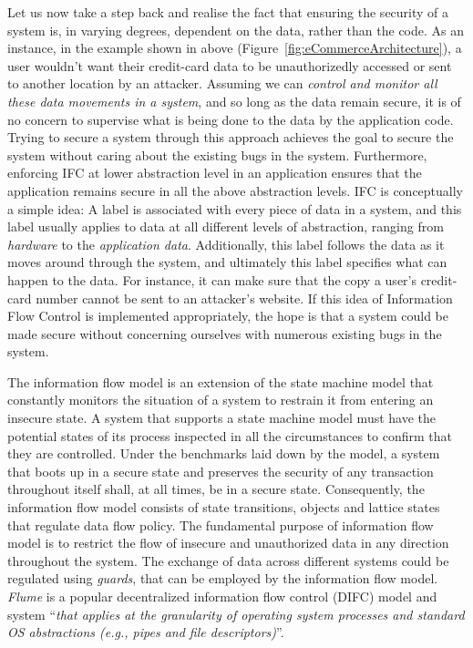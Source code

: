 Let us now take a step back and realise the fact that ensuring the security of a system is, in varying degrees, dependent on the data, rather than the code. As an instance, in the example shown in above (Figure~\ref{fig:eCommerceArchitecture}), a user wouldn’t want their credit-card data to be unauthorizedly accessed or sent to another location by an attacker. Assuming we can \textit{control and monitor all these data movements in a system}, and so long as the data remain secure, it is of no concern to supervise what is being done to the data by the application code. Trying to secure a system through this approach achieves the goal to secure the system without caring about the existing bugs in the system. Furthermore, enforcing IFC at lower abstraction level in an application ensures that the application remains secure in all the above abstraction levels. IFC is conceptually a simple idea: A label is associated with every piece of data in a system, and this label usually applies to data at all different levels of abstraction, ranging from \textit{hardware} to the \textit{application data}. Additionally, this label follows the data as it moves around through the system, and ultimately this label specifies what can happen to the data. For instance, it can make sure that the copy a user's credit-card number cannot be sent to an attacker's website. If this idea of Information Flow Control is implemented appropriately, the hope is that a system could be made secure without concerning ourselves with numerous existing bugs in the system.

The information flow model is an extension of the state machine model that constantly monitors the situation of a system to restrain it from entering an insecure state. A system that supports a state machine model must have the potential states of its process inspected in all the circumstances to confirm that they are controlled. Under the benchmarks laid down by the model, a system that boots up in a secure state and preserves the security of any transaction throughout itself shall, at all times, be in a secure state. Consequently, the information flow model consists of state transitions, objects and lattice states that regulate data flow policy. The fundamental purpose of information flow model is to restrict the flow of insecure and unauthorized data in any direction throughout the system. The exchange of data across different systems could be regulated using \textit{guards}, that can be employed by the information flow model. \textit{Flume} is a popular decentralized information flow control (DIFC)\cite{Myers2000} model and system ``\textit{that applies at the granularity of operating system processes and standard OS abstractions (e.g., pipes and file descriptors)}''\cite{Krohn2007}. 

